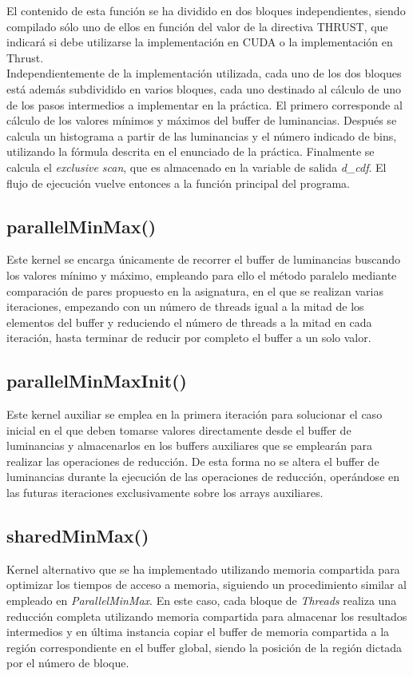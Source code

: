 \documentclass[10pt,oneside,a4paper]{article}
\begin{document}
El contenido de esta función se ha dividido en dos bloques independientes, siendo compilado sólo uno de ellos en función del valor de la directiva THRUST, que indicará si debe utilizarse la implementación en CUDA o la implementación en Thrust.\\

Independientemente de la implementación utilizada, cada uno de los dos bloques está además subdividido en varios bloques, cada uno destinado al cálculo de uno de los pasos intermedios a implementar en la práctica. El primero corresponde al cálculo de los valores mínimos y máximos del buffer de luminancias. Después se calcula un histograma a partir de las luminancias y el número indicado de bins, utilizando la fórmula descrita en el enunciado de la práctica. Finalmente se calcula el \textit{exclusive scan}, que es almacenado en la variable de salida \textit{d\_cdf}. El flujo de ejecución vuelve entonces a la función principal del programa.

\subsection{parallelMinMax()}
Este kernel se encarga únicamente de recorrer el buffer de luminancias buscando los valores mínimo y máximo, empleando para ello el método paralelo mediante comparación de pares propuesto en la asignatura, en el que se realizan varias iteraciones, empezando con un número de threads igual a la mitad de los elementos del buffer y reduciendo el número de threads a la mitad en cada iteración, hasta terminar de reducir por completo el buffer a un solo valor.

\subsection{parallelMinMaxInit()}
Este kernel auxiliar se emplea en la primera iteración para solucionar el caso inicial en el que deben tomarse valores directamente desde el buffer de luminancias y almacenarlos en los buffers auxiliares que se emplearán para realizar las operaciones de reducción. De esta forma no se altera el buffer de luminancias durante la ejecución de las operaciones de reducción, operándose en las futuras iteraciones exclusivamente sobre los arrays auxiliares.

\subsection{sharedMinMax()}
Kernel alternativo que se ha implementado utilizando memoria compartida para optimizar los tiempos de acceso a memoria, siguiendo un procedimiento similar al empleado en \textit{ParallelMinMax}. En este caso, cada bloque de \textit{Threads} realiza una reducción completa utilizando memoria compartida para almacenar los resultados intermedios y en última instancia copiar el buffer de memoria compartida a la región correspondiente en el buffer global, siendo la posición de la región dictada por el número de bloque.\\
\end{document}
